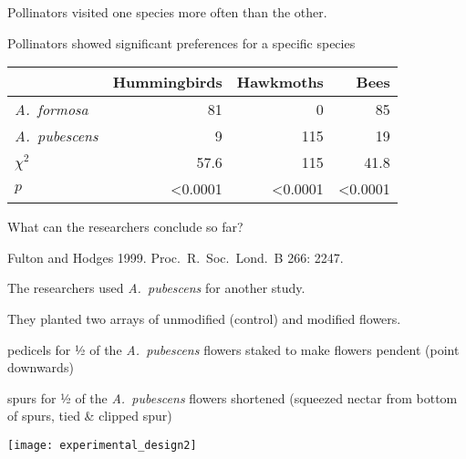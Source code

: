 \documentclass[t,hidelinks]{beamer}
\begin{document}
\begin{frame}[t]{Pollinators visited one species more often than the other.}
\begin{multicols}{3}

	\end{multicols}
\end{frame}
%
\begin{frame}[t]{Pollinators showed significant preferences for a specific species}
		
	\begin{center}
	\begin{tabular}{lrrr}
	\toprule
		 	& Hummingbirds & Hawkmoths & Bees \tabularnewline
	\midrule
	\textit{A.~formosa}		&	81	&	0	&	85 \tabularnewline
	\textit{A.~pubescens}	&	9	&	115	&	19 \tabularnewline
	$\chi^2$				&	57.6	&	115	&	41.8 \tabularnewline
	$p$						&  \textless0.0001 & \textless0.0001 & \textless0.0001 \tabularnewline
	\bottomrule
	\end{tabular}
	\end{center}

	\hangpara What can the researchers conclude so far?

	\vfilll
	
	\hfill \tiny Fulton and Hodges 1999. Proc.~R.~Soc.~Lond.~B 266: 2247.
	
\end{frame}
%
\begin{frame}[t]{The researchers used \textit{A.~pubescens} for another study.}
	
	\vspace*{-\baselineskip}
	
	\hangpara They planted two arrays of unmodified (control) and modified flowers.

	\hangpara {} pedicels for ½ of the \textit{A.~pubescens} flowers staked to make flowers pendent (point downwards)
	
	\hangpara {} spurs for ½ of the \textit{A.~pubescens} flowers shortened (squeezed nectar from bottom of spurs, tied \& clipped spur)
	
	\centering
	\texttt{[image: experimental\_design2]}

\end{frame}
\end{document}
